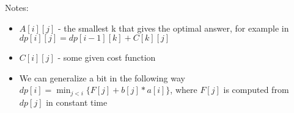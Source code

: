 Notes:

\begin{itemize}
	\item $A[i][j]$ - the smallest k that gives the optimal answer, for example in $dp[i][j] = dp[i-1][k] + C[k][j]$
	\item $C[i][j]$ - some given cost function
	\item We can generalize a bit in the following way $dp[i] = \min_{j<i}\{F[j]+b[j] * a[i]\}$, where $F[j]$ is computed from $dp[j]$ in constant time
\end{itemize}
